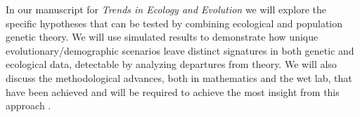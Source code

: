 \documentclass[12pt]{article}
\begin{document}

In our manuscript for {\it Trends in Ecology and Evolution} we will
explore the specific hypotheses that can be tested by combining
ecological and population genetic theory. We will use simulated
results to demonstrate how unique evolutionary/demographic scenarios
leave distinct signatures in both genetic and ecological data,
detectable by analyzing departures from theory. We will also discuss
the methodological advances, both in mathematics and the wet lab, that
have been achieved and will be required to achieve the most insight
from this approach \citep{gibson2014, harte2015ecolLett}.





\end{document}
